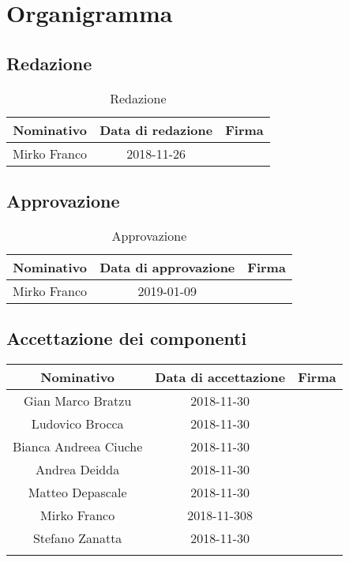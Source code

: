 \chapter{Organigramma}
\section{Redazione}
	\begin{table}[htp]
		\centering
			\begin{tabular}{|c|c|c|}
				\hline
				\textbf{Nominativo} & \textbf{Data di redazione} & \textbf{Firma} \\
				\hline 
				Mirko Franco & 2018-11-26 &  \\
				\hline
			\end{tabular}
				\caption{Redazione}
	\end{table}
\section{Approvazione}
\begin{table}[htp]
	\centering
	\begin{tabular}{|c|c|c|}
		\hline
		\textbf{Nominativo} & \textbf{Data di approvazione} & \textbf{Firma} \\
		\hline 
		Mirko Franco & 2019-01-09 &  \\
		\hline
	\end{tabular}
	\caption{Approvazione}
\end{table}
\clearpage
\section{Accettazione dei componenti}

\begin{tabularx}{\textwidth}{|c|c|c|}
			\hline
			\textbf{Nominativo} & \textbf{Data di accettazione} & \textbf{Firma} \\
			\hline 
			Gian Marco Bratzu & 2018-11-30 & \\
			Ludovico Brocca & 2018-11-30 & \\
			Bianca  Andreea Ciuche & 2018-11-30 & \\
			Andrea Deidda & 2018-11-30 & \\
			Matteo Depascale & 2018-11-30 & \\
	 		Mirko Franco & 2018-11-308 &  \\
	 		Stefano Zanatta & 2018-11-30 & \\
			\hline
		\caption{Accettazione dei componenti}
\end{tabularx}


